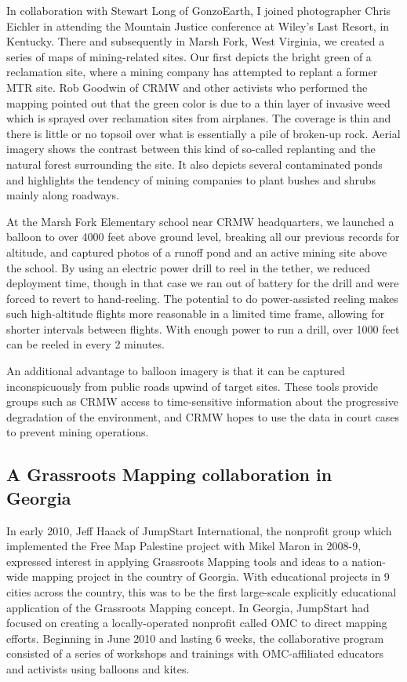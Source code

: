 \documentclass[11pt,oneside,notitlepage]{report}
\begin{document}
{{In collaboration with Stewart Long of GonzoEarth, I joined photographer Chris Eichler in attending the Mountain Justice conference at Wiley's Last Resort, in Kentucky. There and subsequently in Marsh Fork, West Virginia, we created a series of maps of mining-related sites. Our first depicts the bright green of a reclamation site, where a mining company has attempted to replant a former MTR site. Rob Goodwin of CRMW and other activists who performed the mapping pointed out that the green color is due to a thin layer of invasive weed which is sprayed over reclamation sites from airplanes. The coverage is thin and there is little or no topsoil over what is essentially a pile of broken-up rock. Aerial imagery shows the contrast between this kind of so-called replanting and the natural forest surrounding the site. It also depicts several contaminated ponds and highlights the tendency of mining companies to plant bushes and shrubs mainly along roadways. 

At the Marsh Fork Elementary school near CRMW headquarters, we launched a balloon to over 4000 feet above ground level, breaking all our previous records for altitude, and captured photos of a runoff pond and an active mining site above the school. By using an electric power drill to reel in the tether, we reduced deployment time, though in that case we ran out of battery for the drill and were forced to revert to hand-reeling. The potential to do power-assisted reeling makes such high-altitude flights more reasonable in a limited time frame, allowing for shorter intervals between flights. With enough power to run a drill, over 1000 feet can be reeled in every 2 minutes. 

An additional advantage to balloon imagery is that it can be captured inconspicuously from public roads upwind of target sites. These tools provide groups such as CRMW access to time-sensitive information about the progressive degradation of the environment, and CRMW hopes to use the data in court cases to prevent mining operations.

\subsection{A Grassroots Mapping collaboration in Georgia}
\label{subsec:georgia}

In early 2010, Jeff Haack of JumpStart International, the nonprofit group which implemented the Free Map Palestine project with Mikel Maron in 2008-9, expressed interest in applying Grassroots Mapping tools and ideas to a nation-wide mapping project in the country of Georgia. With educational projects in 9 cities across the country, this was to be the first large-scale explicitly educational application of the Grassroots Mapping concept. In Georgia, JumpStart had focused on creating a locally-operated nonprofit called \ac{OMC} to direct mapping efforts. Beginning in June 2010 and lasting 6 weeks, the collaborative program consisted of a series of workshops and trainings with \ac{OMC}-affiliated educators and activists using balloons and kites.

}}
\end{document}
